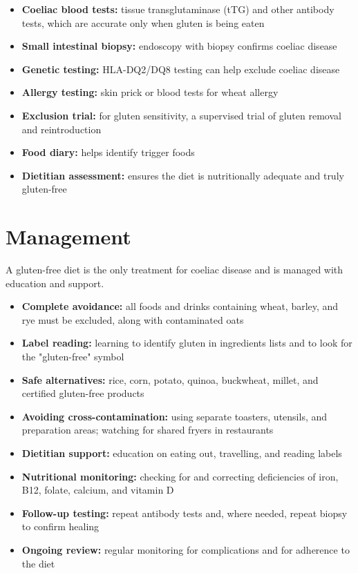 \begin{itemize}
    \item \textbf{Coeliac blood tests:} tissue transglutaminase (tTG) and other antibody tests, which are accurate only when gluten is being eaten
    \item \textbf{Small intestinal biopsy:} endoscopy with biopsy confirms coeliac disease
    \item \textbf{Genetic testing:} HLA-DQ2/DQ8 testing can help exclude coeliac disease
    \item \textbf{Allergy testing:} skin prick or blood tests for wheat allergy
    \item \textbf{Exclusion trial:} for gluten sensitivity, a supervised trial of gluten removal and reintroduction
    \item \textbf{Food diary:} helps identify trigger foods
    \item \textbf{Dietitian assessment:} ensures the diet is nutritionally adequate and truly gluten-free
\end{itemize}

\section*{Management}
A gluten-free diet is the only treatment for coeliac disease and is managed with education and support.

\begin{itemize}
    \item \textbf{Complete avoidance:} all foods and drinks containing wheat, barley, and rye must be excluded, along with contaminated oats
    \item \textbf{Label reading:} learning to identify gluten in ingredients lists and to look for the "gluten-free" symbol
    \item \textbf{Safe alternatives:} rice, corn, potato, quinoa, buckwheat, millet, and certified gluten-free products
    \item \textbf{Avoiding cross-contamination:} using separate toasters, utensils, and preparation areas; watching for shared fryers in restaurants
    \item \textbf{Dietitian support:} education on eating out, travelling, and reading labels
    \item \textbf{Nutritional monitoring:} checking for and correcting deficiencies of iron, B12, folate, calcium, and vitamin D
    \item \textbf{Follow-up testing:} repeat antibody tests and, where needed, repeat biopsy to confirm healing
    \item \textbf{Ongoing review:} regular monitoring for complications and for adherence to the diet
\end{itemize}

